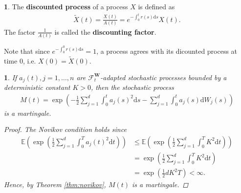 \documentclass[english]{article}
\numberwithin{equation}{section}
\numberwithin{figure}{section}
\theoremstyle{bolddescit}
\theoremstyle{definition}
\newtheorem{definition}[theorem]{\protect\definitionname}
\theoremstyle{definition}
\theoremstyle{plain}
\newtheorem{lemma}[theorem]{\protect\lemmaname}
\theoremstyle{plain}
\theoremstyle{bolddesc}
\theoremstyle{plain}
\theoremstyle{remark}
\providecommand{\definitionname}{Definition}
\providecommand{\lemmaname}{Lemma}
\begin{document}
\begin{definition}
  The \textbf{discounted process} of a process $X$ is defined as
  \begin{align*}
    \widetilde{X}(t) = \frac{X(t)}{A(t)} = e^{-\int_0^t r(s) \mathrm{d}s} X(t).
  \end{align*}
  The factor $\frac{1}{A(t)}$ is called the \textbf{discounting factor}.
\end{definition}

Note that since $e^{-\int_0^0 r(s) \mathrm{d}s} = 1$, a process agrees with its dicounted process at time 0, i.e. $X(0) = \widetilde{X}(0)$.

\begin{lemma}\label{lem:bs-exponential-martingale}
  If $a_j(t), j=1,\ldots,n$ are $\mathcal{F}^\mathbf{W}_t$-adapted stochastic processes bounded by a deterministic constant $K > 0$, then the stochastic process
  \begin{align*}
    M(t) = \exp \left( - \frac{1}{2} \sum_{j=1}^{d} \int_0^t a_j(s)^2 \mathrm{d}s - \sum_{j=1}^{d} \int_0^t a_j(s) \mathrm{d}W_j(s) \right)
  \end{align*}
  is a martingale.

  \begin{proof}
    The Novikov condition holds since
    \begin{align*}
      \mathbb{E}\left(\exp \left(\frac{1}{2} \sum_{j=1}^d \int_0^T a_j(t)^2 \mathrm{d}t\right)\right)
      &\le \mathbb{E}\left(\exp \left(\frac{1}{2} \sum_{j=1}^d \int_0^T K^2 \mathrm{d}t\right)\right)\\
      &= \exp \left(\frac{1}{2} \sum_{j=1}^d \int_0^T K^2 \mathrm{d}t\right)\\
      &= \exp \left(\frac{1}{2} d K^2 T \right) < \infty.
    \end{align*}
    Hence, by Theorem \ref{thm:novikov}, $M(t)$ is a martingale.
  \end{proof}
\end{lemma}
\end{document}
